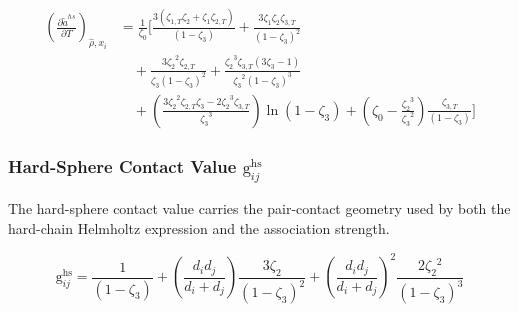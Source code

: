 \documentclass[12pt, letterpaper]{article}
\begin{document}
\begin{equation}
    \begin{aligned}
        \left(\frac{\partial\tilde{a}^{hs}}{\partial T}\right)_{\hat{\rho},x_{i}}
        &=\frac{1}{\zeta_{0}}\Bigg[
        \frac{3(\zeta_{1,T}\zeta_{2}+\zeta_{1}\zeta_{2,T})}{(1-\zeta_{3})}
        +\frac{3\zeta_{1}\zeta_{2}\zeta_{3,T}}{(1-\zeta_{3})^{2}}
        \\
        &\quad
        +\frac{3{\zeta_{2}}^{2}{\zeta_{2,T}}}{\zeta_{3}{(1-\zeta_{3})}^{2}}
        +\frac{{\zeta_{2}}^{3}{\zeta_{3,T}}(3{\zeta_{3}}-1)}{{\zeta_{3}}^{2}{(1-\zeta_{3})}^{3}}
        \\
        &\quad
        +\left(\frac{3{\zeta_{2}}^{2}{\zeta_{2,T}}{\zeta_{3}}-2{\zeta_{2}}^{3}{\zeta_{3,T}}}{{\zeta_{3}}^{3}}\right)\ln(1-{\zeta_{3}})
        +\left({\zeta_{0}}-\frac{{\zeta_{2}}^{3}}{{\zeta_{3}}^{2}}\right)\frac{\zeta_{3,T}}{(1-\zeta_{3})}
        \Bigg]
    \end{aligned}
    \label{eq:hs_ares_dT}
\end{equation}

\subsubsection{Hard-Sphere Contact Value \texorpdfstring{\(\mathrm{g}_{ij}^{\mathrm{hs}}\)}{g_hs}}

The hard-sphere contact value carries the pair-contact geometry used by both the hard-chain Helmholtz expression and the association strength.

\begin{equation}
    \mathrm{g}_{i j}^{\mathrm{hs}}=\frac{1}{\left(1-\zeta_{3}\right)}+\left(\frac{d_{i} d_{j}}{d_{i}+d_{j}}\right) \frac{3 \zeta_{2}}{\left(1-\zeta_{3}\right)^2} + \left(\frac{d_{i} d_{j}}{d_{i}+d_{j}}\right)^2 \frac{2 \zeta_{2}{ }^2}{\left(1-\zeta_{3}\right)^3}
    \label{eq:g_hs_contact}
\end{equation}

\end{document}
